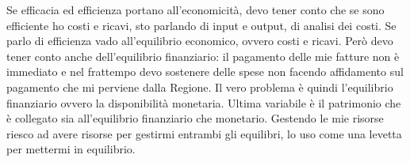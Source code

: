 Se efficacia ed efficienza portano all'economicità, devo tener conto che se sono efficiente ho costi e ricavi, sto parlando di input e output, di analisi dei costi. Se parlo di efficienza vado all'equilibrio economico, ovvero costi e ricavi. Però devo tener conto anche dell'equilibrio finanziario: il pagamento delle mie fatture non è immediato e nel frattempo devo sostenere delle spese non facendo affidamento sul pagamento che mi perviene dalla Regione. Il vero problema è quindi l'equilibrio finanziario ovvero la disponibilità monetaria. Ultima variabile è il patrimonio che è collegato sia all'equilibrio finanziario che monetario. Gestendo le mie risorse riesco ad avere risorse per gestirmi entrambi gli equilibri, lo uso come una levetta per mettermi in equilibrio.
